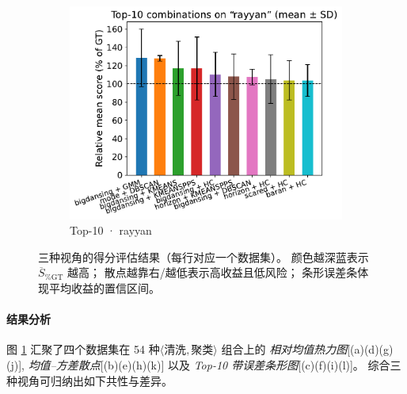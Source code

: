 \documentclass[10pt]{article} %
\numberwithin{equation}{section}
\begin{document}
\begin{figure}[htbp]
\begin{subfigure}{0.34\linewidth}
    \centering
    \includegraphics[width=\linewidth]{figures/5.3.1graph/top10_bar_error_rayyan.pdf}
    \caption{Top-10 · rayyan}
  \end{subfigure}

  \caption{三种视角的得分评估结果（每行对应一个数据集）。%
           颜色越深蓝表示 \(\overline{S}_{\%\mathrm{GT}}\) 越高；%
           散点越靠右/越低表示高收益且低风险；%
           条形误差条体现平均收益的置信区间。
           }
  \label{fig:score_eval_all}
\end{figure}

\paragraph{结果分析}
\label{sec:score_eval_exp_analysis}

图 \ref{fig:score_eval_all} 汇聚了四个数据集在
54 种\(\langle\!\text{清洗},\text{聚类}\!\rangle\) 组合上的
\emph{相对均值热力图}[(a)(d)(g)(j)],
\emph{均值–方差散点}[(b)(e)(h)(k)]
以及 \emph{Top-10 带误差条形图}[(c)(f)(i)(l)]。
综合三种视角可归纳出如下共性与差异。
\end{document}
